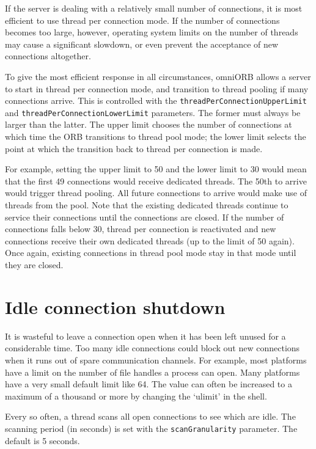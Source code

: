 \documentclass[11pt,twoside,a4paper]{book}
\newcommand{\code}[1]{\texttt{#1}}
\newcommand{\dsc}{\discretionary{}{}{}}
\begin{document}
If the server is dealing with a relatively small number of
connections, it is most efficient to use thread per connection mode.
If the number of connections becomes too large, however, operating
system limits on the number of threads may cause a significant
slowdown, or even prevent the acceptance of new connections
altogether.

To give the most efficient response in all circumstances, omniORB
allows a server to start in thread per connection mode, and transition
to thread pooling if many connections arrive. This is controlled with
the \code{threadPerConnection\dsc{}UpperLimit} and
\code{threadPerConnectionLowerLimit} parameters. The former must
always be larger than the latter. The upper limit chooses the number
of connections at which time the ORB transitions to thread pool mode;
the lower limit selects the point at which the transition back to
thread per connection is made.

For example, setting the upper limit to 50 and the lower limit to 30
would mean that the first 49 connections would receive dedicated
threads. The 50th to arrive would trigger thread pooling. All future
connections to arrive would make use of threads from the pool. Note
that the existing dedicated threads continue to service their
connections until the connections are closed. If the number of
connections falls below 30, thread per connection is reactivated and
new connections receive their own dedicated threads (up to the limit
of 50 again). Once again, existing connections in thread pool mode
stay in that mode until they are closed.


\section{Idle connection shutdown}
\label{sec:connShutdown}

It is wasteful to leave a connection open when it has been left unused
for a considerable time. Too many idle connections could block out new
connections when it runs out of spare communication channels. For
example, most platforms have a limit on the number of file handles a
process can open. Many platforms have a very small default limit like
64. The value can often be increased to a maximum of a thousand or
more by changing the `ulimit' in the shell.

Every so often, a thread scans all open connections to see which are
idle. The scanning period (in seconds) is set with the
\code{scanGranularity} parameter. The default is 5 seconds.
\end{document}
